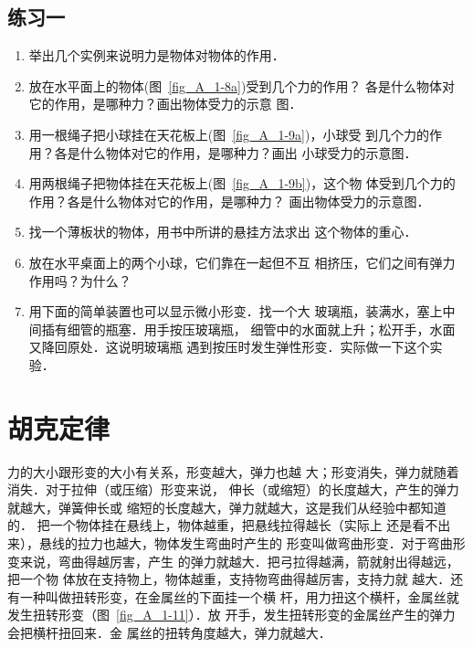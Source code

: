 \subsection*{练习一} 
\begin{enumerate} 
\item  举出几个实例来说明力是物体对物体的作用．
\item 放在水平面上的物体(图~\ref{fig_A_1-8a})受到几个力的作用？
  各是什么物体对它的作用，是哪种力？画出物体受力的示意
  图．
\item 用一根绳子把小球挂在天花板上(图~\ref{fig_A_1-9a})，小球受
  到几个力的作用？各是什么物体对它的作用，是哪种力？画出
  小球受力的示意图．
\item 用两根绳子把物体挂在天花板上(图~\ref{fig_A_1-9b})，这个物
  体受到几个力的作用？各是什么物体对它的作用，是哪种力？
  画出物体受力的示意图．
 \item 找一个薄板状的物体，用书中所讲的悬挂方法求出
  这个物体的重心．
 \item 放在水平桌面上的两个小球，它们靠在一起但不互
相挤压，它们之间有弹力作用吗？为什么？
\item 用下面的简单装置也可以显示微小形变．找一个大
玻璃瓶，装满水，塞上中间插有细管的瓶塞．用手按压玻璃瓶，
细管中的水面就上升；松开手，水面又降回原处．这说明玻璃瓶
遇到按压时发生弹性形变．实际做一下这个实验．
\end{enumerate} 

\section{胡克定律} 
力的大小跟形变的大小有关系，形变越大，弹力也越
大；形变消失，弹力就随着消失．对于拉伸（或压缩）形变来说，
伸长（或缩短）的长度越大，产生的弹力就越大，弹簧伸长或
缩短的长度越大，弹力就越大，这是我们从经验中都知道的．
把一个物体挂在悬线上，物体越重，把悬线拉得越长（实际上
还是看不出来），悬线的拉力也越大，物体发生弯曲时产生的
形变叫做弯曲形变．对于弯曲形变来说，弯曲得越厉害，产生
的弹力就越大．把弓拉得越满，箭就射出得越远，把一个物
体放在支持物上，物体越重，支持物弯曲得越厉害，支持力就
越大．还有一种叫做扭转形变，在金属丝的下面挂一个横
杆，用力扭这个横杆，金属丝就发生扭转形变（图~\ref{fig_A_1-11}）．放
开手，发生扭转形变的金属丝产生的弹力会把横杆扭回来．金
属丝的扭转角度越大，弹力就越大．

